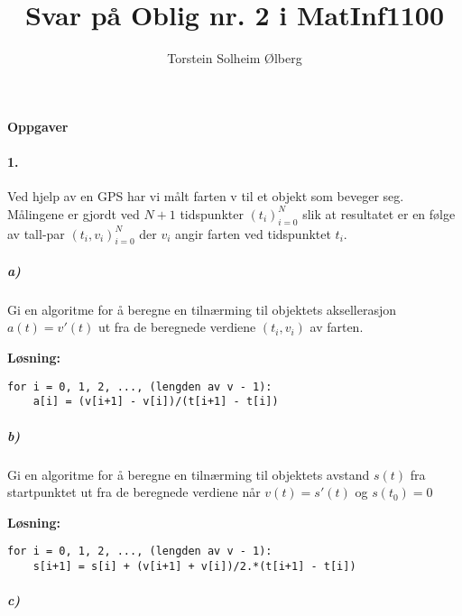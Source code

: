 \documentclass[11pt,norsk]{article}
\author{Torstein Solheim Ølberg}
\title{Svar på Oblig nr. 2 i MatInf1100}
\begin{document}
\maketitle
	\begin{center}
\Large \textbf{Oppgaver}
	\end{center}
		\paragraph{1.}
			\begin{flushleft}
Ved hjelp av en GPS har vi målt farten v til et objekt som beveger seg. Målingene er gjordt ved $N + 1$ tidspunkter $(t_i)_{i=0}^{N}$ slik at resultatet er en følge av tall-par $(t_i, v_i)_{i=0}^{N}$ der $v_i$ angir farten ved tidspunktet $t_i$.
			\end{flushleft}
			\subparagraph{a)}
				\begin{flushleft}
Gi en algoritme for å beregne en tilnærming til objektets aksellerasjon $a(t) = v'(t)$ ut fra de beregnede verdiene $(t_i, v_i)$ av farten.
				\end{flushleft}
				\begin{flushleft}
\textbf{Løsning:}
				\end{flushleft}
				\begin{flushleft}
					\begin{lstlisting}[frame=single]
for i = 0, 1, 2, ..., (lengden av v - 1):
	a[i] = (v[i+1] - v[i])/(t[i+1] - t[i])
					\end{lstlisting}
				\end{flushleft}
			\subparagraph{b)}
				\begin{flushleft}
Gi en algoritme for å beregne en tilnærming til objektets avstand $s(t)$ fra startpunktet ut fra de beregnede verdiene når $v(t) = s'(t)$ og $s(t_0) = 0$
				\end{flushleft}
				\begin{flushleft}
\textbf{Løsning:}
				\end{flushleft}
				\begin{flushleft}
					\begin{lstlisting}[frame=single]
for i = 0, 1, 2, ..., (lengden av v - 1):
	s[i+1] = s[i] + (v[i+1] + v[i])/2.*(t[i+1] - t[i])
					\end{lstlisting}
				\end{flushleft}
			\subparagraph{c)}
\end{document}
